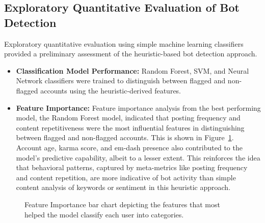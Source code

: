\documentclass[
  12pt,
  letterpaper,
  DIV=11,
  numbers=noendperiod]{scrartcl}
\begin{document}
\subsection{Exploratory Quantitative Evaluation of Bot
Detection}\label{exploratory-quantitative-evaluation-of-bot-detection}

Exploratory quantitative evaluation using simple machine learning
classifiers provided a preliminary assessment of the heuristic-based bot
detection approach.

\begin{itemize}
\item
  \textbf{Classification Model Performance:} Random Forest, SVM, and
  Neural Network classifiers were trained to distinguish between flagged
  and non-flagged accounts using the heuristic-derived features.
\item
  \textbf{Feature Importance:} Feature importance analysis from the best
  performing model, the Random Forest model, indicated that posting
  frequency and content repetitiveness were the most influential
  features in distinguishing between flagged and non-flagged accounts.
  This is shown in Figure~\ref{fig-importance}. Account age, karma
  score, and em-dash presence also contributed to the model's predictive
  capability, albeit to a lesser extent. This reinforces the idea that
  behavioral patterns, captured by meta-metrics like posting frequency
  and content repetition, are more indicative of bot activity than
  simple content analysis of keywords or sentiment in this heuristic
  approach.
\end{itemize}

\begin{figure}


\caption{\label{fig-importance}Feature Importance bar chart depicting
the features that most helped the model classify each user into
categories.}

\end{figure}%
\end{document}
